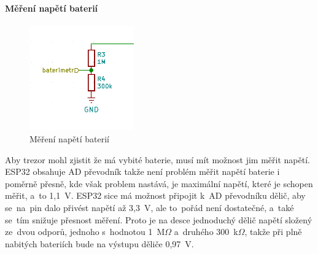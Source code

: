\newpage

\paragraph*{Měření napětí baterií}

\begin{figure}
    \centering
    \includegraphics[width=0.4\textwidth]{kapitoly/obrazky/E4/napajeni/delic_baterimetru.png}
    \caption{Měření napětí baterií\label{fig:frog1}}
\end{figure}

Aby trezor mohl zjistit že má vybité baterie, musí mít možnost jim měřit napětí. ESP32 obsahuje AD převodník takže není problém měřit napětí baterie 
i poměrně přesně, kde však problem nastává, je maximální napětí, které je schopen měřit, a~to 1,1~V. ESP32 sice má možnost připojit k~AD převodníku dělič,
aby se~na~pin dalo přivést napětí až 3,3~V, ale to~pořád není dostatečné, a~také se~tím snižuje přesnost měření. Proto je na desce jednoduchý dělič napětí
složený ze~dvou odporů, jednoho s~hodnotou 1~M$\Omega$ a~druhého 300~k$\Omega$, takže při plně nabitých bateriích bude na výstupu děliče 0,97~V. %

\newpage